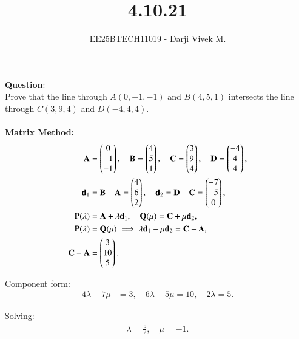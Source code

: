 \documentclass[journal]{IEEEtran}
\begin{document}


\title{4.10.21}
\author{EE25BTECH11019 - Darji Vivek M.}
{\let\newpage\relax\maketitle}

\renewcommand{\thefigure}{\theenumi}
\renewcommand{\thetable}{\theenumi}
\setlength{\intextsep}{10pt}
\renewcommand{\thetable}{\theenumi}

\textbf{Question}:\\
Prove that the line through $A(0,-1,-1)$ and $B(4,5,1)$ intersects the line through $C(3,9,4)$ and $D(-4,4,4)$.\\[4pt]

\solution \\[-2mm]

\textbf{Matrix Method:}\\
\begin{align}
\mathbf{A}&=\begin{pmatrix}0\\-1\\-1\end{pmatrix},\quad
\mathbf{B}=\begin{pmatrix}4\\5\\1\end{pmatrix},\quad
\mathbf{C}=\begin{pmatrix}3\\9\\4\end{pmatrix},\quad
\mathbf{D}=\begin{pmatrix}-4\\4\\4\end{pmatrix},\\
\mathbf{d}_1&=\mathbf{B}-\mathbf{A}=\begin{pmatrix}4\\6\\2\end{pmatrix},\quad
\mathbf{d}_2=\mathbf{D}-\mathbf{C}=\begin{pmatrix}-7\\-5\\0\end{pmatrix},\\
\mathbf{P}(\lambda)&=\mathbf{A}+\lambda\mathbf{d}_1,\quad
\mathbf{Q}(\mu)=\mathbf{C}+\mu\mathbf{d}_2,\\
\mathbf{P}(\lambda)&=\mathbf{Q}(\mu)\implies 
\lambda\mathbf{d}_1-\mu\mathbf{d}_2=\mathbf{C}-\mathbf{A},\\
\mathbf{C}-\mathbf{A}&=\begin{pmatrix}3\\10\\5\end{pmatrix}.
\end{align}

Component form:
\begin{align}
4\lambda+7\mu&=3, \quad
6\lambda+5\mu=10, \quad
2\lambda=5.
\end{align}

Solving:
\begin{align}
\lambda=\tfrac{5}{2},\quad \mu=-1.
\end{align}
\end{document}
